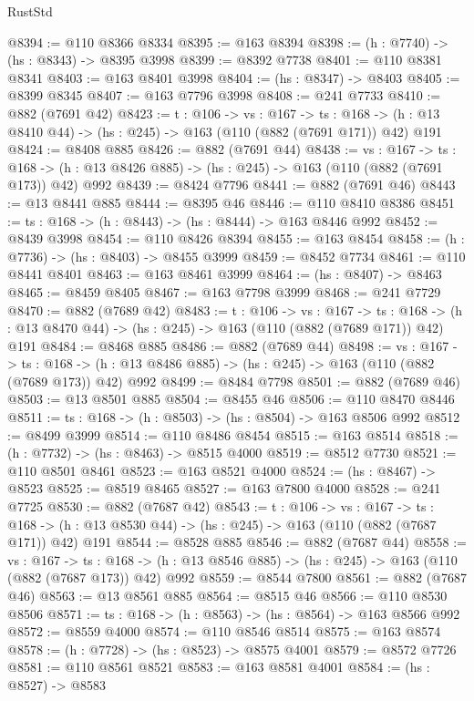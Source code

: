 \begin{lexlean}{RustStd}
\begin{coremodule}
@8394 := @110 @8366 @8334
@8395 := @163 @8394
@8398 := (h : @7740) -> (hs : @8343) -> @8395 @3998
@8399 := @8392 @7738
@8401 := @110 @8381 @8341
@8403 := @163 @8401 @3998
@8404 := (hs : @8347) -> @8403
@8405 := @8399 @8345
@8407 := @163 @7796 @3998
@8408 := @241 @7733
@8410 := @882 (@7691 @42)
@8423 := {t : @106} ->
  {vs : @167} ->
  {ts : @168} -> (h : @13 @8410 @44) -> (hs : @245) -> @163 (@110 (@882 (@7691 @171)) @42) @191
@8424 := @8408 @885
@8426 := @882 (@7691 @44)
@8438 := {vs : @167} ->
  {ts : @168} -> (h : @13 @8426 @885) -> (hs : @245) -> @163 (@110 (@882 (@7691 @173)) @42) @992
@8439 := @8424 @7796
@8441 := @882 (@7691 @46)
@8443 := @13 @8441 @885
@8444 := @8395 @46
@8446 := @110 @8410 @8386
@8451 := {ts : @168} -> (h : @8443) -> (hs : @8444) -> @163 @8446 @992
@8452 := @8439 @3998
@8454 := @110 @8426 @8394
@8455 := @163 @8454
@8458 := (h : @7736) -> (hs : @8403) -> @8455 @3999
@8459 := @8452 @7734
@8461 := @110 @8441 @8401
@8463 := @163 @8461 @3999
@8464 := (hs : @8407) -> @8463
@8465 := @8459 @8405
@8467 := @163 @7798 @3999
@8468 := @241 @7729
@8470 := @882 (@7689 @42)
@8483 := {t : @106} ->
  {vs : @167} ->
  {ts : @168} -> (h : @13 @8470 @44) -> (hs : @245) -> @163 (@110 (@882 (@7689 @171)) @42) @191
@8484 := @8468 @885
@8486 := @882 (@7689 @44)
@8498 := {vs : @167} ->
  {ts : @168} -> (h : @13 @8486 @885) -> (hs : @245) -> @163 (@110 (@882 (@7689 @173)) @42) @992
@8499 := @8484 @7798
@8501 := @882 (@7689 @46)
@8503 := @13 @8501 @885
@8504 := @8455 @46
@8506 := @110 @8470 @8446
@8511 := {ts : @168} -> (h : @8503) -> (hs : @8504) -> @163 @8506 @992
@8512 := @8499 @3999
@8514 := @110 @8486 @8454
@8515 := @163 @8514
@8518 := (h : @7732) -> (hs : @8463) -> @8515 @4000
@8519 := @8512 @7730
@8521 := @110 @8501 @8461
@8523 := @163 @8521 @4000
@8524 := (hs : @8467) -> @8523
@8525 := @8519 @8465
@8527 := @163 @7800 @4000
@8528 := @241 @7725
@8530 := @882 (@7687 @42)
@8543 := {t : @106} ->
  {vs : @167} ->
  {ts : @168} -> (h : @13 @8530 @44) -> (hs : @245) -> @163 (@110 (@882 (@7687 @171)) @42) @191
@8544 := @8528 @885
@8546 := @882 (@7687 @44)
@8558 := {vs : @167} ->
  {ts : @168} -> (h : @13 @8546 @885) -> (hs : @245) -> @163 (@110 (@882 (@7687 @173)) @42) @992
@8559 := @8544 @7800
@8561 := @882 (@7687 @46)
@8563 := @13 @8561 @885
@8564 := @8515 @46
@8566 := @110 @8530 @8506
@8571 := {ts : @168} -> (h : @8563) -> (hs : @8564) -> @163 @8566 @992
@8572 := @8559 @4000
@8574 := @110 @8546 @8514
@8575 := @163 @8574
@8578 := (h : @7728) -> (hs : @8523) -> @8575 @4001
@8579 := @8572 @7726
@8581 := @110 @8561 @8521
@8583 := @163 @8581 @4001
@8584 := (hs : @8527) -> @8583

\end{coremodule}
\end{lexlean}
